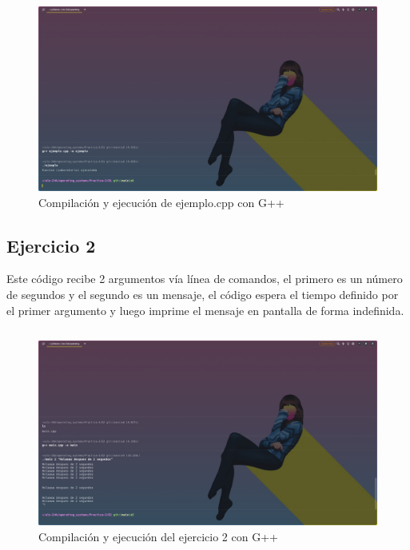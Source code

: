 \documentclass[]{article}
\newenvironment{code}{\captionsetup{type=listing}}{}
\begin{document}
\begin{figure}[h]
	\caption{Compilación y ejecución de ejemplo.cpp con G++}
	\centering
	\includegraphics[scale=0.3,trim={0 0 20cm 27cm},clip]{e1-ejemplo-out.png}  
\end{figure}


\subsection{Ejercicio 2}
Este código recibe 2 argumentos vía línea de comandos, el primero es un 
número de segundos y el segundo es un mensaje, el código espera el tiempo
definido por el primer argumento y luego imprime el mensaje en pantalla 
de forma indefinida.
\begin{code}
	\inputminted{cpp}{../E2/main.cpp}
\end{code}
\newpage
\begin{figure}[h]
	\caption{Compilación y ejecución del ejercicio 2 con G++}
	\centering
	\includegraphics[scale=0.3,trim={0 0 20cm 15cm},clip]{e2-out.png}  
\end{figure}
\end{document}

